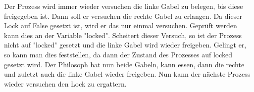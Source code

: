 








Der Prozess wird immer wieder versuchen die linke Gabel zu belegen, bis diese freigegeben ist. Dann soll er versuchen die rechte Gabel zu erlangen. Da dieser Lock auf False gesetzt ist, wird er das nur einmal versuchen. Geprüft werden kann dies an der Variable "locked". Scheitert dieser Versuch, so ist der Prozess nicht auf "locked" gesetzt und die linke Gabel wird wieder freigeben. Gelingt er, so kann man dies feststellen, da dann der Zustand des Prozesses auf locked gesetzt wird. Der Philosoph hat nun beide Gabeln, kann essen, dann die rechte und zuletzt auch die linke Gabel wieder freigeben. Nun kann der nächste Prozess wieder versuchen den Lock zu ergattern.
 







